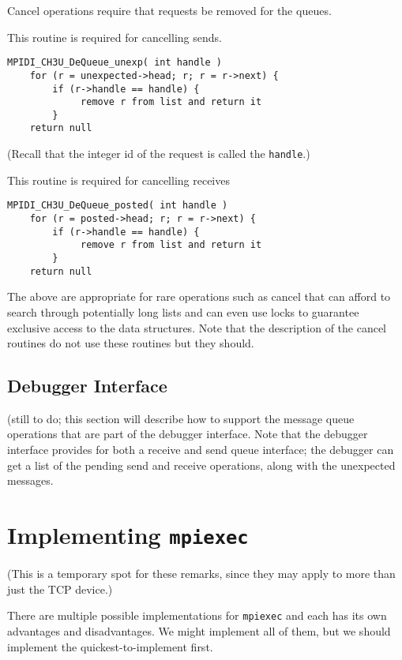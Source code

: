 \documentclass{article}
\def\code{\begingroup\makeustext\eatcode}
\def\eatcode#1{\texttt{#1}\endgroup}
\begin{document}
Cancel operations require that requests be removed for the queues.

This routine is required for cancelling sends.
\begin{verbatim}
MPIDI_CH3U_DeQueue_unexp( int handle )
    for (r = unexpected->head; r; r = r->next) {
        if (r->handle == handle) {
             remove r from list and return it
        }
    return null
\end{verbatim}
(Recall that the integer id of the request is called the \code{handle}.)

This routine is required for cancelling receives
\begin{verbatim}
MPIDI_CH3U_DeQueue_posted( int handle )
    for (r = posted->head; r; r = r->next) {
        if (r->handle == handle) {
             remove r from list and return it
        }
    return null
\end{verbatim}
The above are appropriate for rare operations such as cancel that can 
afford to search through potentially long lists and can even use locks
to guarantee exclusive access to the data structures.  Note that the
description of the cancel routines do not use these routines but they should.

\subsection{Debugger Interface}
(still to do; this section will describe how to support the message
queue operations that are part of the debugger interface.  Note that
the debugger interface provides for both a receive and send queue
interface; the debugger can get a list of the pending send and receive
operations, along with the unexpected messages.

\section{Implementing \code{mpiexec}}
\label{sec:mpiexec}

(This is a temporary spot for these remarks, since they may apply to more than
just the TCP device.)

There are multiple possible implementations for \code{mpiexec} and each has
its own advantages and disadvantages.  We might implement all of them, but we
should implement the quickest-to-implement first.
\end{document}
